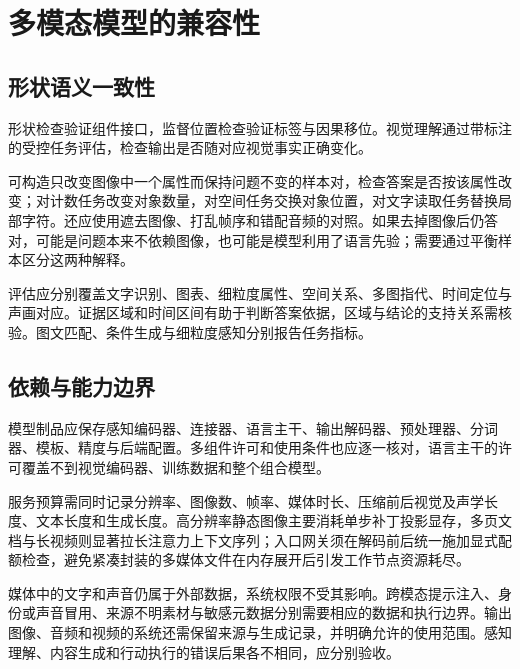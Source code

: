\documentclass[../textbook.tex]{subfiles}
\begin{document}
\section{多模态模型的兼容性}

\subsection{形状语义一致性}
形状检查验证组件接口，监督位置检查验证标签与因果移位。视觉理解通过带标注的受控任务评估，检查输出是否随对应视觉事实正确变化。

可构造只改变图像中一个属性而保持问题不变的样本对，检查答案是否按该属性改变；对计数任务改变对象数量，对空间任务交换对象位置，对文字读取任务替换局部字符。还应使用遮去图像、打乱帧序和错配音频的对照。如果去掉图像后仍答对，可能是问题本来不依赖图像，也可能是模型利用了语言先验；需要通过平衡样本区分这两种解释。

评估应分别覆盖文字识别、图表、细粒度属性、空间关系、多图指代、时间定位与声画对应。证据区域和时间区间有助于判断答案依据，区域与结论的支持关系需核验。图文匹配、条件生成与细粒度感知分别报告任务指标。

\subsection{依赖与能力边界}
模型制品应保存感知编码器、连接器、语言主干、输出解码器、预处理器、分词器、模板、精度与后端配置。多组件许可和使用条件也应逐一核对，语言主干的许可覆盖不到视觉编码器、训练数据和整个组合模型。

服务预算需同时记录分辨率、图像数、帧率、媒体时长、压缩前后视觉及声学长度、文本长度和生成长度。高分辨率静态图像主要消耗单步补丁投影显存，多页文档与长视频则显著拉长注意力上下文序列；入口网关须在解码前后统一施加显式配额检查，避免紧凑封装的多媒体文件在内存展开后引发工作节点资源耗尽。

媒体中的文字和声音仍属于外部数据，系统权限不受其影响。跨模态提示注入、身份或声音冒用、来源不明素材与敏感元数据分别需要相应的数据和执行边界。输出图像、音频和视频的系统还需保留来源与生成记录，并明确允许的使用范围。感知理解、内容生成和行动执行的错误后果各不相同，应分别验收。




\chapterreferences
\myendchapterdocument
\end{document}
